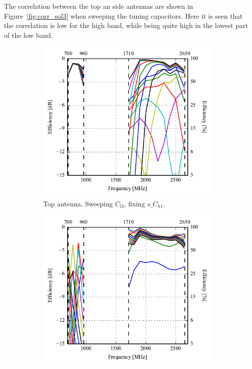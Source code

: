 The correlation between the top an side antennas are shown in Figure~\ref{fig:corr_sol3} when sweeping the tuning capacitors. Here it is seen that the correlation is low for the high band, while being quite high in the lowest part of the low band.  

\begin{figure}[htbp]
    \centering
    \begin{subfigure}{0.49\linewidth}
        \centering
        \includegraphics{img/tech_sol/nonresonant/simulation/freespace/Efficiency_AC2/efficiency-ac2-top.pdf}
        \caption{Top antenna. Sweeping $C_{l3}$, fixing $s\_C_{h1}$.}
    \end{subfigure}
    \hfill
    \begin{subfigure}{0.49\linewidth}
        \centering
        \includegraphics{img/tech_sol/nonresonant/simulation/freespace/Efficiency_AC3/efficiency-ac3-side.pdf}

\end{subfigure}
\end{figure}
